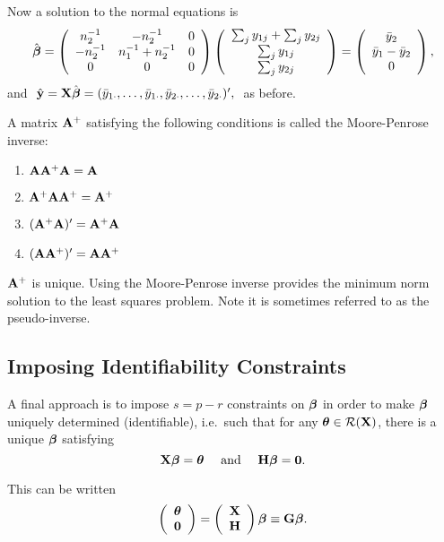 Now a solution to the normal equations is
$$
\hat{\mbox{\boldmath $\beta$}}
=
\left(\begin{array}{ccc}
	n_2^{-1} & -n_2^{-1} & 0 \\
	-n_2^{-1} & n_1^{-1}+n_2^{-1} & 0 \\
	0 & 0 & 0
\end{array}\right)
\left(\begin{array}{c}
	\sum_j y_{1j}+\sum_j y_{2j} \\
	\sum_j y_{1j} \\
	\sum_j y_{2j}
\end{array}\right)
=
\left(\begin{array}{c}
	\bar{y}_2\\\bar{y}_1-\bar{y}_2\\0
\end{array}\right),
$$
and $\ \hat{\bfy}=\bfX\hat{\bfbet} =(\bar{y}_{1\cdot}, \ldots,
\bar{y}_{1\cdot}, \bar{y}_{2\cdot}, \ldots, \bar{y}_{2\cdot})',\ $ as
before.

\eexa


\bsdefi 
A matrix $\mathbf{A}^{+}$ satisfying the following conditions is called the Moore-Penrose inverse:
\begin{enumerate}
\item $\mathbf{A} \mathbf{A}^{+} \mathbf{A} = \mathbf{A}$ 

\item $\mathbf{A}^{+} \mathbf{A} \mathbf{A}^{+} = \mathbf{A}^{+}$

\item  $ (\mathbf{A}^{+} \mathbf{A})' = \mathbf{A}^{+} \mathbf{A}$
 
\item  $ (\mathbf{A} \mathbf{A}^{+})' = \mathbf{A} \mathbf{A}^{+}$
\end{enumerate}
\esdefi
$\mathbf{A}^{+}$ is unique.
Using the Moore-Penrose inverse provides the minimum norm solution to the least squares problem.
Note it is sometimes referred to as the pseudo-inverse.

\subsection{Imposing Identifiability Constraints}

A final approach is to impose $s = p-r$ constraints on $\mbox{\boldmath $\beta$}$ in order to make $\mbox{\boldmath $\beta$}$ uniquely
determined (identifiable), i.e.~such that for any $\mbox{\boldmath $\theta$}\in{\cal
R}(\mathbf{X})$, there is a unique $\mbox{\boldmath $\beta$}$ satisfying
$$
\mathbf{X}\mbox{\boldmath $\beta$}=\mbox{\boldmath $\theta$}
\quad
\mbox{ and }
\quad
\mathbf{H}\mbox{\boldmath $\beta$}=\mathbf{0}.
$$ 

This can be written
$$
\left(\begin{array}{c} \mbox{\boldmath $\theta$} \\ \mathbf{0} \end{array}\right)
= \left(\begin{array}{c} \mathbf{X} \\ \mathbf{H} \end{array}\right) \mbox{\boldmath $\beta$}
\equiv \mathbf{G}\mbox{\boldmath $\beta$}.
$$ 

